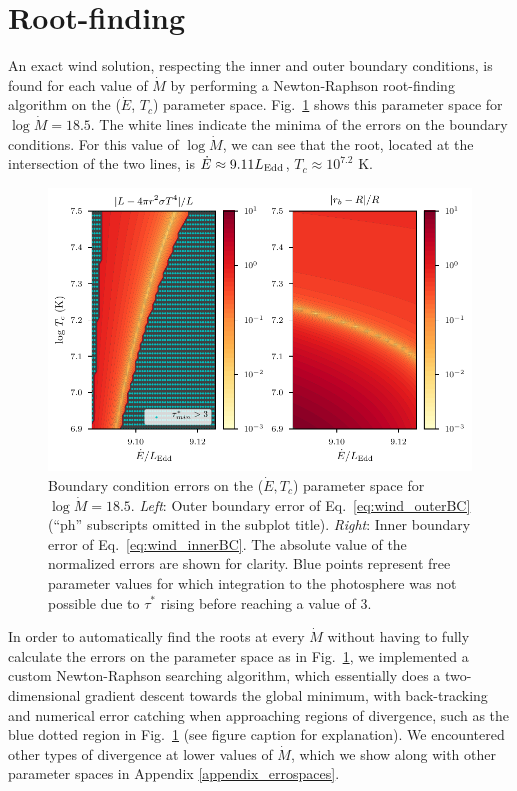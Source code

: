 \documentclass[../main.tex]{subfiles}
\begin{document}
\section{Root-finding}\label{section:wind_rootfinding}
An exact wind solution, respecting the inner and outer boundary conditions, is found for each value of $\dot{M}$ by performing a Newton-Raphson root-finding algorithm on the ($\dot{E}$, $T_c$) parameter space. Fig.~\ref{fig:errorspace_18_5} shows this parameter space for $\log\dot{M}=18.5$. The white lines indicate the minima of the errors on the boundary conditions. For this value of $\log\dot{M}$, we can see that the root, located at the intersection of the two lines, is $\dot{E}\approx 9.11L_\text{Edd}$, $T_c\approx 10
^{7.2}$ K.  

\begin{figure}[htb!]
    \centering
    \includegraphics[width=\textwidth]{figures/errorspace_18_5.pdf}
    \caption[B.C. errors on the $\log\dot{M}=18.5$ wind parameter space]{Boundary condition errors on the ($\dot{E},T_c$) parameter space for $\log\dot{M}=18.5$. \textit{Left}: Outer boundary error of Eq.~\eqref{eq:wind_outerBC} (``ph'' subscripts omitted in the subplot title). \textit{Right}: Inner boundary error of Eq.~\eqref{eq:wind_innerBC}. The absolute value of the normalized errors are shown for clarity. Blue points represent free parameter values for which integration to the photosphere was not possible due to $\tau^*$ rising before reaching a value of 3.}
    \label{fig:errorspace_18_5}
\end{figure}

In order to automatically find the roots at every $\dot{M}$ without having to fully calculate the errors on the parameter space as in Fig.~\ref{fig:errorspace_18_5}, we implemented a custom Newton-Raphson searching algorithm, which essentially does a two-dimensional gradient descent towards the global minimum, with back-tracking and numerical error catching when approaching regions of divergence, such as the blue dotted region in Fig.~\ref{fig:errorspace_18_5} (see figure caption for explanation). We encountered other types of divergence at lower values of $\dot{M}$, which we show along with other parameter spaces in Appendix \ref{appendix_errospaces}. 
\end{document}
